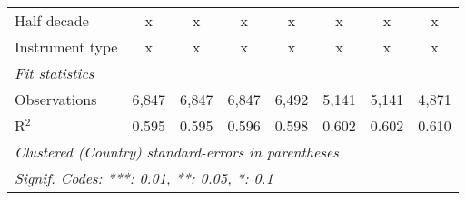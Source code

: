\begin{tabular}{lccccccc}
   Half decade                                                                                               & x              & x              & x              & x              & x       & x       & x\\  
   Instrument type                                                                                           & x              & x              & x              & x              & x       & x       & x\\  
   \midrule \emph{Fit statistics}\\
   Observations                                                                                              & 6,847          & 6,847          & 6,847          & 6,492          & 5,141   & 5,141   & 4,871\\  
   R$^2$                                                                                                     & 0.595          & 0.595          & 0.596          & 0.598          & 0.602   & 0.602   & 0.610\\  
   \midrule
   \multicolumn{8}{l}{\emph{Clustered (Country) standard-errors in parentheses}}\\
   \multicolumn{8}{l}{\emph{Signif. Codes: ***: 0.01, **: 0.05, *: 0.1}}\\
\end{tabular}
\par\endgroup



